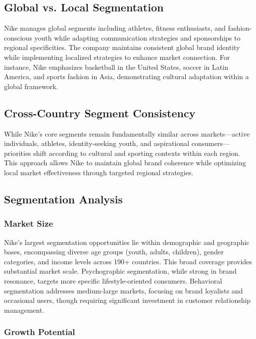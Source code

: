\documentclass[letterpaper, 12pt]{article}
\begin{document}
\subsection{Global vs. Local Segmentation}

Nike manages global segments including athletes, fitness enthusiasts, and fashion-conscious youth while adapting communication strategies and sponsorships to regional specificities. The company maintains consistent global brand identity while implementing localized strategies to enhance market connection. For instance, Nike emphasizes basketball in the United States, soccer in Latin America, and sports fashion in Asia, demonstrating cultural adaptation within a global framework.

\subsection{Cross-Country Segment Consistency}

While Nike's core segments remain fundamentally similar across markets—active individuals, athletes, identity-seeking youth, and aspirational consumers—priorities shift according to cultural and sporting contexts within each region. This approach allows Nike to maintain global brand coherence while optimizing local market effectiveness through targeted regional strategies.

\subsection{Segmentation Analysis}

\subsubsection{Market Size}

Nike's largest segmentation opportunities lie within demographic and geographic bases, encompassing diverse age groups (youth, adults, children), gender categories, and income levels across 190+ countries. This broad coverage provides substantial market scale. Psychographic segmentation, while strong in brand resonance, targets more specific lifestyle-oriented consumers. Behavioral segmentation addresses medium-large markets, focusing on brand loyalists and occasional users, though requiring significant investment in customer relationship management.

\subsubsection{Growth Potential}
\end{document}

